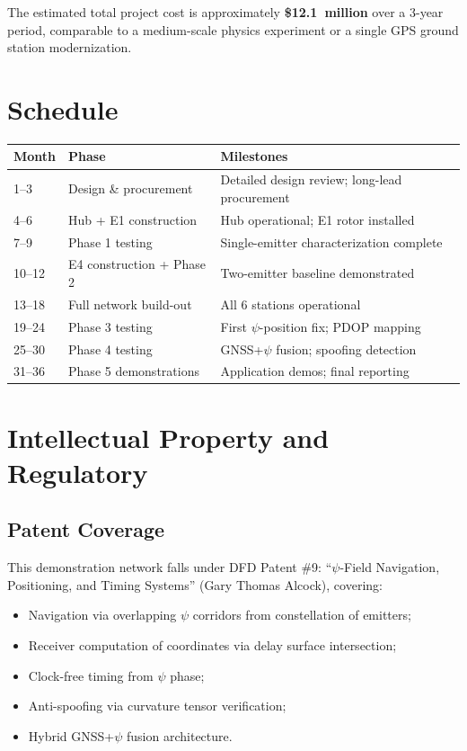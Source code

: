 \documentclass[11pt,a4paper]{article}
\begin{document}
The estimated total project cost is approximately \textbf{\$12.1~million}
over a 3-year period, comparable to a medium-scale physics experiment
or a single GPS ground station modernization.

\section{Schedule}

\begin{longtable}{p{2cm}p{4cm}p{6cm}}
\toprule
\textbf{Month} & \textbf{Phase} & \textbf{Milestones} \\
\midrule
\endfirsthead
1--3 & Design \& procurement & Detailed design review; long-lead procurement \\
4--6 & Hub + E1 construction & Hub operational; E1 rotor installed \\
7--9 & Phase 1 testing & Single-emitter characterization complete \\
10--12 & E4 construction + Phase 2 & Two-emitter baseline demonstrated \\
13--18 & Full network build-out & All 6 stations operational \\
19--24 & Phase 3 testing & First $\psi$-position fix; PDOP mapping \\
25--30 & Phase 4 testing & GNSS+$\psi$ fusion; spoofing detection \\
31--36 & Phase 5 demonstrations & Application demos; final reporting \\
\bottomrule
\end{longtable}

\section{Intellectual Property and Regulatory}

\subsection{Patent Coverage}

This demonstration network falls under DFD Patent \#9: ``$\psi$-Field
Navigation, Positioning, and Timing Systems'' (Gary Thomas Alcock),
covering:
\begin{itemize}
\item Navigation via overlapping $\psi$ corridors from constellation of
  emitters;
\item Receiver computation of coordinates via delay surface intersection;
\item Clock-free timing from $\psi$ phase;
\item Anti-spoofing via curvature tensor verification;
\item Hybrid GNSS+$\psi$ fusion architecture.
\end{itemize}
\end{document}
